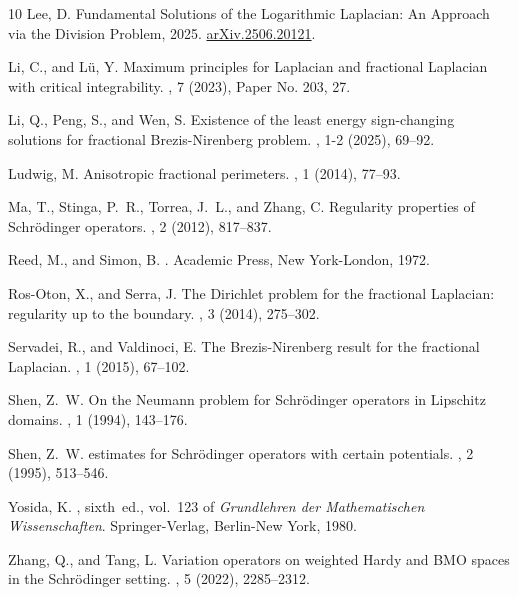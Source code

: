 \documentclass[10pt, a4paper, reqno]{amsart}
\theoremstyle{definition}
\theoremstyle{remark}
\numberwithin{equation}{section}
\begin{document}
\begin{thebibliography}{10}
{\sc Lee, D.}
\newblock Fundamental {S}olutions of the {L}ogarithmic {L}aplacian: {A}n {A}pproach via the {D}ivision {P}roblem, 2025.
\newblock \href{https://arxiv.org/abs/2506.20121}{arXiv.2506.20121}.

{\sc Li, C., and L\"{u}, Y.}
\newblock Maximum principles for {L}aplacian and fractional {L}aplacian with critical integrability.
, 7 (2023), Paper No. 203, 27.

{\sc Li, Q., Peng, S., and Wen, S.}
\newblock Existence of the least energy sign-changing solutions for fractional {B}rezis-{N}irenberg problem.
, 1-2 (2025), 69--92.

{\sc Ludwig, M.}
\newblock Anisotropic fractional perimeters.
, 1 (2014), 77--93.

{\sc Ma, T., Stinga, P.~R., Torrea, J.~L., and Zhang, C.}
\newblock Regularity properties of {S}chr\"{o}dinger operators.
, 2 (2012), 817--837.

{\sc Reed, M., and Simon, B.}
.
\newblock Academic Press, New York-London, 1972.

{\sc Ros-Oton, X., and Serra, J.}
\newblock The {D}irichlet problem for the fractional {L}aplacian: regularity up to the boundary.
, 3 (2014), 275--302.

{\sc Servadei, R., and Valdinoci, E.}
\newblock The {B}rezis-{N}irenberg result for the fractional {L}aplacian.
, 1 (2015), 67--102.

{\sc Shen, Z.~W.}
\newblock On the {N}eumann problem for {S}chr\"{o}dinger operators in {L}ipschitz domains.
, 1 (1994), 143--176.

{\sc Shen, Z.~W.}
 estimates for {S}chr\"{o}dinger operators with certain potentials.
, 2 (1995), 513--546.

{\sc Yosida, K.}
, sixth~ed., vol.~123 of {\em Grundlehren der Mathematischen Wissenschaften}.
\newblock Springer-Verlag, Berlin-New York, 1980.

{\sc Zhang, Q., and Tang, L.}
\newblock Variation operators on weighted {H}ardy and {BMO} spaces in the {S}chr\"{o}dinger setting.
, 5 (2022), 2285--2312.

\end{thebibliography}
\end{document}
